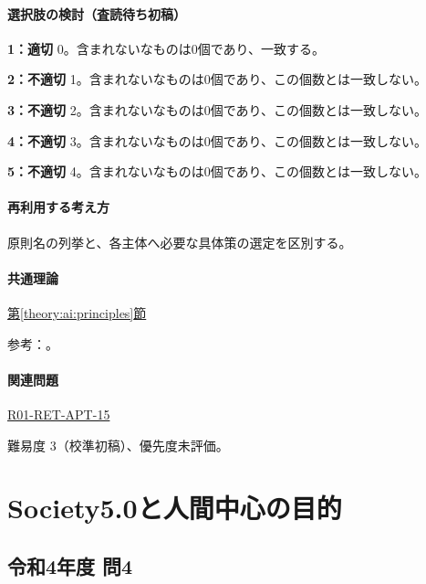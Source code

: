 \paragraph{選択肢の検討（査読待ち初稿）}\mbox{}\par

\noindent\textbf{1：適切} 0。含まれないなものは0個であり、一致する。\par

\noindent\textbf{2：不適切} 1。含まれないなものは0個であり、この個数とは一致しない。\par

\noindent\textbf{3：不適切} 2。含まれないなものは0個であり、この個数とは一致しない。\par

\noindent\textbf{4：不適切} 3。含まれないなものは0個であり、この個数とは一致しない。\par

\noindent\textbf{5：不適切} 4。含まれないなものは0個であり、この個数とは一致しない。\par

\paragraph{再利用する考え方} 原則名の列挙と、各主体へ必要な具体策の選定を区別する。

\paragraph{共通理論} \hyperref[theory:ai:principles]{第\ref*{theory:ai:principles}節}

\par 参考：\cite{ai_use2019}。

\paragraph{関連問題} \hyperref[q:r01-ret-apt-15]{R01-RET-APT-15}

\par 難易度 3（校準初稿）、優先度未評価。

\section{Society5.0と人間中心の目的}

\subsection{令和4年度 問4}
\label{q:r04-reg-apt-04}

